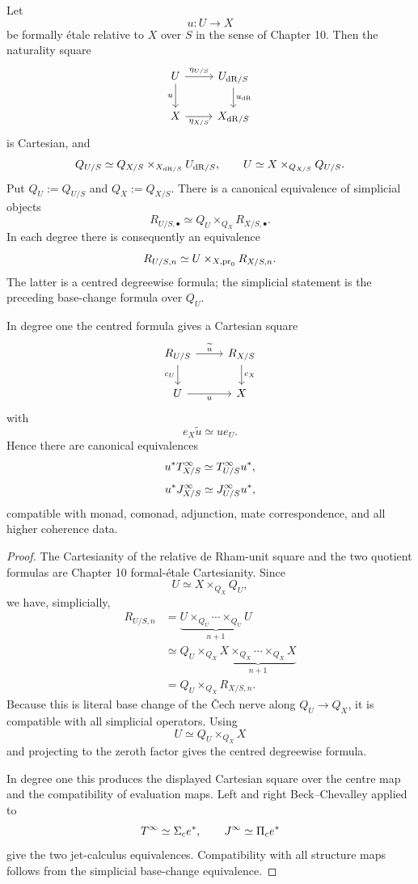 \begin{theorem}
\label{thm:jet-formal-etale}
Let
\[
    u:U\longrightarrow X
\]
be formally \'{e}tale relative to $X$ over $S$ in the sense of Chapter 10.  Then the naturality square
\[
\begin{tikzcd}
U \arrow[r,"\eta_{U/S}"] \arrow[d,"u"']
& U_{\dR/S} \arrow[d,"u_{\dR}"]
\\
X \arrow[r,"\eta_{X/S}"']
& X_{\dR/S}
\end{tikzcd}
\]
is Cartesian, and
\[
    Q_{U/S}
    \simeq
    Q_{X/S}\times_{X_{\mathrm{dR}/S}}U_{\mathrm{dR}/S},
    \qquad
    U\simeq X\times_{Q_{X/S}}Q_{U/S}.
\]
Put $Q_U:=Q_{U/S}$ and $Q_X:=Q_{X/S}$.  There is a canonical equivalence of simplicial objects
\[
\boxed{
    R_{U/S,\bullet}
    \simeq
    Q_U\times_{Q_X}R_{X/S,\bullet}.
}
\]
In each degree there is consequently an equivalence
\[
    R_{U/S,n}
    \simeq
    U\times_{X,\operatorname{pr}_0}R_{X/S,n}.
\]
The latter is a centred degreewise formula; the simplicial statement is the preceding base-change formula over $Q_U$.

In degree one the centred formula gives a Cartesian square
\[
\begin{tikzcd}
R_{U/S} \arrow[r,"\widetilde u"] \arrow[d,"c_U"']
& R_{X/S} \arrow[d,"c_X"]
\\
U \arrow[r,"u"']
& X
\end{tikzcd}
\]
with
\[
    e_X\widetilde u\simeq ue_U.
\]
Hence there are canonical equivalences
\[
    u^*T^{\infty}_{X/S}
    \simeq
    T^{\infty}_{U/S}u^*,
\]
\[
    u^*J^{\infty}_{X/S}
    \simeq
    J^{\infty}_{U/S}u^*,
\]
compatible with monad, comonad, adjunction, mate correspondence, and all higher coherence data.
\end{theorem}

\begin{proof}
The Cartesianity of the relative de Rham-unit square and the two quotient formulas are Chapter 10 formal-\'{e}tale Cartesianity.  Since
\[
    U\simeq X\times_{Q_X}Q_U,
\]
we have, simplicially,
\[
\begin{aligned}
R_{U/S,n}
&=
\underbrace{U\times_{Q_U}\cdots\times_{Q_U}U}_{n+1}\\
&\simeq
Q_U\times_{Q_X}
\underbrace{X\times_{Q_X}\cdots\times_{Q_X}X}_{n+1}\\
&=
Q_U\times_{Q_X}R_{X/S,n}.
\end{aligned}
\]
Because this is literal base change of the \v{C}ech nerve along $Q_U\to Q_X$, it is compatible with all simplicial operators.  Using
\[
    U\simeq Q_U\times_{Q_X}X
\]
and projecting to the zeroth factor gives the centred degreewise formula.

In degree one this produces the displayed Cartesian square over the centre map and the compatibility of evaluation maps.  Left and right Beck--Chevalley applied to
\[
    T^{\infty}\simeq\Sigma_ce^*,
    \qquad
    J^{\infty}\simeq\Pi_ce^*
\]
give the two jet-calculus equivalences.  Compatibility with all structure maps follows from the simplicial base-change equivalence.
\end{proof}

